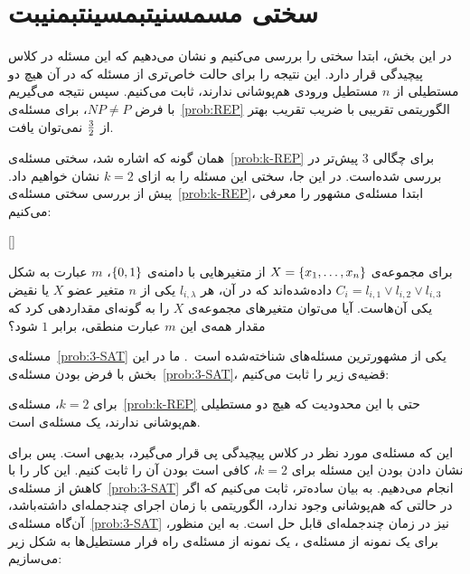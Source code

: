 

\chapter{سختی مسمسنیتبمسینتبمنیبت}
در این بخش، ابتدا سختی  را بررسی می‌کنیم و نشان می‌دهیم که این مسئله در کلاس پیچیدگی  قرار دارد. این نتیجه را برای حالت خاص‌تری از مسئله که در آن هیچ دو مستطیلی از $n$ مستطیل ورودی هم‌پوشانی ندارند، ثابت می‌کنیم. سپس نتیجه می‌گیریم با فرض $NP \neq P$، برای مسئله‌ی~\ref{prob:REP} الگوریتمی تقریبی با ضریب تقریب بهتر از ${3} \over {2}$ نمی‌توان یافت.


همان گونه که اشاره شد، سختی مسئله‌ی~\ref{prob:k-REP} برای چگالی $3$ پیش‌تر در \cite{REP} بررسی شده‌است. در این جا، سختی این مسئله را به ازای $k = 2$ نشان خواهیم داد. پیش از بررسی سختی مسئله‌ی~\ref{prob:k-REP}، ابتدا مسئله‌ی مشهور  را معرفی می‌کنیم:

[]
\label{prob:3-SAT}

برای مجموعه‌ی $X = {\{ x_{1}, \ldots, x_{n} \}}$ از متغیر‌هایی با دامنه‌ی ${\{ 0, 1 \}}$، $m$ عبارت به شکل $C_{i} = l_{i, 1} \vee l_{i, 2} \vee l_{i, 3}$ داده‌شده‌اند که در آن، هر $l_{i, \lambda}$ یکی از $n$ متغیر‌ عضو $X$ یا نقیض یکی آن‌هاست.
آیا می‌توان متغیر‌های مجموعه‌ی $X$ را به گونه‌ای مقداردهی کرد که مقدار همه‌ی این $m$ عبارت‌ منطقی، برابر $1$ شود؟


مسئله‌ی~\ref{prob:3-SAT} یکی از مشهور‌ترین مسئله‌های  شناخته‌شده است~\cite{Karp}. ما در این بخش با فرض  بودن مسئله‌ی~\ref{prob:3-SAT}، قضیه‌ی زیر را ثابت می‌کنیم:

\label{theorem:NP-complete-2REP}

برای $k = 2$، مسئله‌ی~\ref{prob:k-REP} حتی با این محدودیت که هیچ دو مستطیلی هم‌پوشانی ندارند، یک مسئله‌ی  است.



این که مسئله‌ی مورد نظر در کلاس پیچیدگی ‌پی{} قرار می‌گیرد، بدیهی است. پس برای نشان دادن  بودن این مسئله برای $k = 2$، کافی است  بودن آن را ثابت کنیم. این کار را با کاهش از مسئله‌ی~\ref{prob:3-SAT} انجام می‌دهیم. به بیان ساده‌تر، ثابت می‌کنیم که اگر  در حالتی که هم‌پوشانی وجود ندارد، الگوریتمی با زمان اجرای چند‌جمله‌ای داشته‌باشد، آن‌گاه مسئله‌ی~\ref{prob:3-SAT} نیز در زمان چند‌جمله‌ای قابل حل است. به این منظور، برای یک نمونه از مسئله‌ی ، یک نمونه از مسئله‌ی راه فرار مستطیل‌ها به شکل زیر می‌سازیم:

